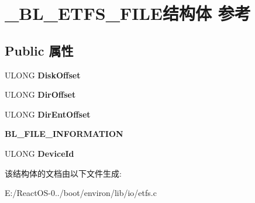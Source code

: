 \hypertarget{struct___b_l___e_t_f_s___f_i_l_e}{}\section{\+\_\+\+B\+L\+\_\+\+E\+T\+F\+S\+\_\+\+F\+I\+L\+E结构体 参考}
\label{struct___b_l___e_t_f_s___f_i_l_e}
\subsection*{Public 属性}
\begin{DoxyCompactItemize}
\item 
\mbox{\label{struct___b_l___e_t_f_s___f_i_l_e_a4d91375adeb177acb6ffbc6e995726d0}} 
U\+L\+O\+NG {\bfseries Disk\+Offset}
\item 
\mbox{\label{struct___b_l___e_t_f_s___f_i_l_e_aea714ee6f5c32d64bfa27e5761a239ba}} 
U\+L\+O\+NG {\bfseries Dir\+Offset}
\item 
\mbox{\label{struct___b_l___e_t_f_s___f_i_l_e_a21f6c168d3179bfc8a3988d4ae34be6e}} 
U\+L\+O\+NG {\bfseries Dir\+Ent\+Offset}
\item 
\mbox{\label{struct___b_l___e_t_f_s___f_i_l_e_a817cb3a29d3dd6d91b104a343f9bbaf0}} 
{\bfseries B\+L\+\_\+\+F\+I\+L\+E\+\_\+\+I\+N\+F\+O\+R\+M\+A\+T\+I\+ON}
\item 
\mbox{\label{struct___b_l___e_t_f_s___f_i_l_e_a5cbc0eb977cb4690122f745b2a9e80ca}} 
U\+L\+O\+NG {\bfseries Device\+Id}
\end{DoxyCompactItemize}


该结构体的文档由以下文件生成\+:\begin{DoxyCompactItemize}
\item 
E\+:/\+React\+O\+S-\/0../boot/environ/lib/io/etfs.\+c\end{DoxyCompactItemize}
